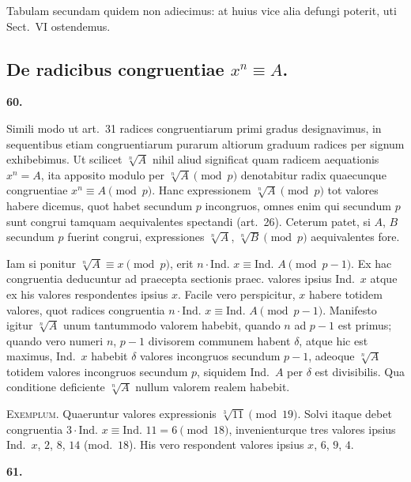 \documentclass[12pt,a4paper]{article}
\theoremstyle{plain}
\theoremstyle{definition}
\theoremstyle{remark}
\begin{document}
Tabulam secundam quidem non adiecimus: at huius vice alia defungi poterit, uti Sect.~VI ostendemus.

\subsection*{De radicibus congruentiae $x^n \equiv A$.}

\setcounter{satz}{60}
\addtocounter{satz}{-1}
\textbf{60.}

Simili modo ut art.~31 radices congruentiarum primi gradus designavimus, in sequentibus etiam congruentiarum purarum altiorum graduum radices per signum exhibebimus. Ut scilicet $\sqrt[n]{A}$ nihil aliud significat quam radicem aequationis $x^n = A$, ita apposito modulo per $\sqrt[n]{A} \pmod{p}$ denotabitur radix quaecunque congruentiae $x^n \equiv A \pmod{p}$. Hanc expressionem $\sqrt[n]{A} \pmod{p}$ tot valores habere dicemus, quot habet secundum $p$ incongruos, omnes enim qui secundum $p$ sunt congrui tamquam aequivalentes spectandi (art.~26). Ceterum patet, si $A$, $B$ secundum $p$ fuerint congrui, expressiones $\sqrt[n]{A}$, $\sqrt[n]{B} \pmod{p}$ aequivalentes fore.

Iam si ponitur $\sqrt[n]{A} \equiv x \pmod{p}$, erit $n \cdot \text{Ind. } x \equiv \text{Ind. } A \pmod{p-1}$. Ex hac congruentia deducuntur ad praecepta sectionis praec. valores ipsius Ind.~$x$ atque ex his valores respondentes ipsius $x$. Facile vero perspicitur, $x$ habere totidem valores, quot radices congruentia $n \cdot \text{Ind. } x \equiv \text{Ind. } A \pmod{p-1}$. Manifesto igitur $\sqrt[n]{A}$ unum tantummodo valorem habebit, quando $n$ ad $p-1$ est primus; quando vero numeri $n$, $p-1$ divisorem communem habent $\delta$, atque hic est maximus, Ind.~$x$ habebit $\delta$ valores incongruos secundum $p-1$, adeoque $\sqrt[n]{A}$ totidem valores incongruos secundum $p$, siquidem Ind.~$A$ per $\delta$ est divisibilis. Qua conditione deficiente $\sqrt[n]{A}$ nullum valorem realem habebit.

\textsc{Exemplum.} Quaeruntur valores expressionis $\sqrt[3]{11} \pmod{19}$. Solvi itaque debet congruentia $3 \cdot \text{Ind. } x \equiv \text{Ind. } 11 = 6 \pmod{18}$, invenienturque tres valores ipsius Ind.~$x$, $2$, $8$, $14$ (mod.~$18$). His vero respondent valores ipsius $x$, $6$, $9$, $4$.


\setcounter{satz}{61}
\addtocounter{satz}{-1}
\textbf{61.}
\end{document}
